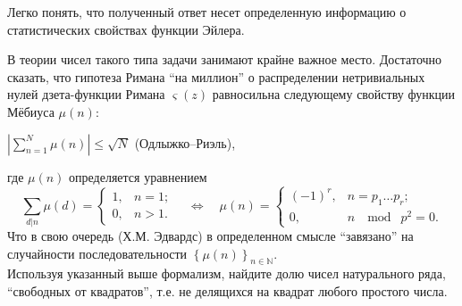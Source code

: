 \begin{problem}
Легко понять, что полученный ответ несет определенную информацию о 
статистических свойствах функции Эйлера.

В теории чисел такого типа задачи занимают крайне важное место. Достаточно 
сказать, что гипотеза Римана ``на миллион'' о распределении нетривиальных 
нулей дзета-функции Римана $\varsigma \left( z \right)$ равносильна 
следующему свойству функции Мёбиуса $\mu(n)$:

\begin{center}
$\left| {\sum\limits_{n=1}^N {\mu \left( n \right)} } \right|\le \sqrt N $ 
(Одлыжко--Риэль),
\end{center}
где $\mu(n)$ определяется уравнением
\[
\sum\limits_{d \vert n} \mu(d) = 
\begin{cases}
1, & n = 1; \\
0, & n > 1.
\end{cases}
\quad
\Leftrightarrow
\quad
\mu(n) = 
\begin{cases}
(-1)^r, & n = p_1\ldots p_r; \\
0, & n \;  \mod \; p^2 = 0.
\end{cases}
\]
Что в свою очередь (Х.М. Эдвардс) в определенном смысле ``завязано'' на 
случайности последовательности $\left\{ {\mu \left( n \right)} 
\right\}_{n\in {\mathbb N}} $.\\


\noindent Используя указанный выше формализм, найдите долю чисел натурального ряда, 
``свободных от квадратов'', т.е. не делящихся на квадрат любого простого 
числа.

\end{problem}

